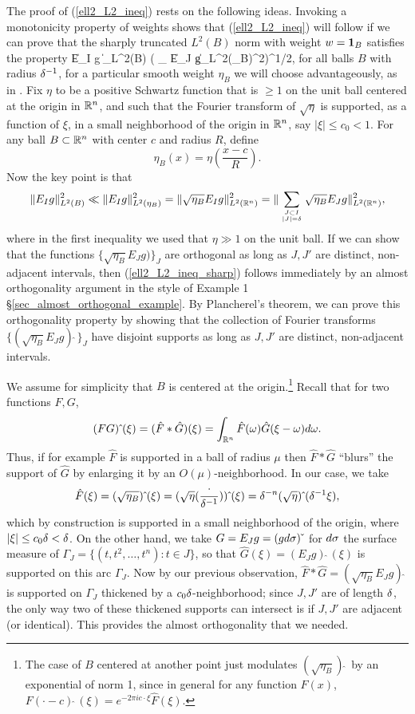 \documentclass[brochure,english,12pt]{bourbaki}%
\begin{document}
The proof of (\ref{ell2_L2_ineq}) rests on the following ideas. Invoking  a monotonicity property of weights \cite[Lemma 7.1]{BDG16} shows that (\ref{ell2_L2_ineq}) will follow if we can prove  that the sharply truncated $L^2(B)$ norm with weight $w=\boldsymbol1_B$ satisfies the property 
\beq\label{ell2_L2_ineq_sharp}
\| E_I g \|_{L^2(B)} \ll ( \sum_{} \| E_J g\|_{L^2(\eta_{B})}^2)^{1/2},
\eeq
 for all balls $B$ with radius $\delta^{-1}$, for a particular smooth weight $\eta_{B}$ we will choose advantageously, as in \cite[Lemma 8.1]{BDG16}. Fix $\eta$ to be a positive Schwartz function that is $\geq 1$ on the unit ball centered at the origin in $\mathbb{R}^n$, and such that the Fourier transform of $\sqrt{\eta}$ is supported, as a function of $\xi$, in a small neighborhood of the origin in $\mathbb{R}^n$, say $|\xi | \leq c_0 <1$. For any ball $B \subset \mathbb{R}^n$ with center $c$ and radius $R$, define 
\[ \eta_B(x) = \eta ( \frac{x-c}{R}).\]
Now the key point is that 
\[ \|E_I g\|^2_{L^2(B)} \ll \|E_I g\|^2_{L^2 (\eta_{B})}  = \| \sqrt{\eta_{B}} E_I g\|_{L^2(\mathbb{R}^n)}^2
	=\|  \sum_{J \subset I  \atop |J| = \delta} \sqrt{\eta_{B}} E_J g  \|_{L^2(\mathbb{R}^n)}^2, \]
where in the first inequality we used that $\eta \gg 1$ on the unit ball.
If we can show that the  functions $\{\sqrt{\eta_{B}} E_J g)\}_J$ are orthogonal as long as $J,J'$ are distinct, non-adjacent intervals, then (\ref{ell2_L2_ineq_sharp}) follows immediately by an almost orthogonality argument in the style of Example 1 \S \ref{sec_almost_orthogonal_example}. By Plancherel's theorem, we can prove this orthogonality property by showing that  the collection of Fourier transforms $\{(\sqrt{\eta_{B}} E_J g) \hat{\;}\}_J$ have disjoint supports as long as $J,J'$ are distinct, non-adjacent intervals. 

We assume for simplicity that $B$ is centered at the origin.\footnote{The case of $B$ centered at another point just modulates $(\sqrt{\eta_{B}})\hat{\;}$ by an exponential of norm 1, since in general for any function $F(x)$, $F( \cdot - c)\hat{\;}(\xi) = e^{-2\pi i c \cdot \xi} \hat{F}(\xi).$}
Recall that for two functions $F, G$, 
\[ (FG)\hat{\;}  (\xi) =( \hat{F} * \hat{G} )(\xi) = \int_{\mathbb{R}^n} \hat{F}(\omega)\hat{G}(\xi - \omega) d\omega.\]
Thus, if for example $\hat{F}$ is supported in a ball of radius $\mu$ then $\hat{F} * \hat{G}$ ``blurs'' the support of $\hat{G}$ by enlarging it by an  $O(\mu)$-neighborhood. In our case, we take
\[\hat{F}(\xi) = (\sqrt{\eta_{B}})\hat{\;} (\xi)=(\sqrt{\eta}(\frac{\cdot}{\delta^{-1}}))\hat{\;}  (\xi) = \delta^{-n} (\sqrt{\eta})\hat{\;}  (  \delta^{-1} \xi),\]
 which by construction is supported in a small neighborhood of the origin, where $|\xi| \leq c_0 \delta<\delta$. 
On the other hand, we take $G=E_J g=(gd\sigma)\check{\;}$ for $d \sigma$ the surface measure of $\Gamma_J = \{(t,t^2,\ldots, t^n): t \in J\}$, so that $\hat{G} (\xi) = (E_J g)\hat{\;}(\xi)$ is supported on this arc $\Gamma_J$. 
Now by our previous observation, $\hat{F} * \hat{G} = (\sqrt{\eta_{B}} E_J g) \hat{\;}$ is supported on $\Gamma_J$ thickened by a $c_0\delta$-neighborhood; since $J,J'$ are of length $\delta$, the only way two of these thickened supports can intersect is if $J,J'$ are adjacent (or identical). This provides the almost orthogonality that we needed.
\end{document}
